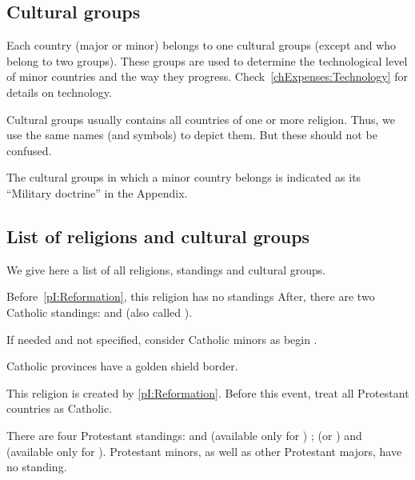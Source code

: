 \subsection{Cultural groups}

\aparag Each country (major or minor) belongs to one cultural groups (except
\POL and \RUS who belong to two groups).
\bparag These groups are used to determine the technological level of minor
countries and the way they progress. Check~\ref{chExpenses:Technology} for
details on technology.

\aparag Cultural groups usually contains all countries of one or more
religion. Thus, we use the same names (and symbols) to depict them. But these
should not be confused.

\aparag The cultural groups in which a minor country belongs is indicated as
its ``Military doctrine'' in the Appendix.



\subsection{List of religions and cultural groups}

\label{chThePowers:List of religions}
\aparag We give here a list of all religions, standings and cultural groups.


\aparag Before~\ref{pI:Reformation}, this religion has no standings
\bparag After, there are two Catholic standings:  and
 (also called ).

\bparag If needed and not specified, consider Catholic minors as begin
\CATHCR.

\aparag Catholic provinces have a golden shield border.

\aparag This religion is created by \ref{pI:Reformation}.
\bparag Before this event, treat all Protestant countries as Catholic.

%
\aparag There are four Protestant standings:  and
 (available only for \ANG) ;  (or
) and  (available only for \SUE).
\bparag Protestant minors, as well as other Protestant majors, have no
standing.

